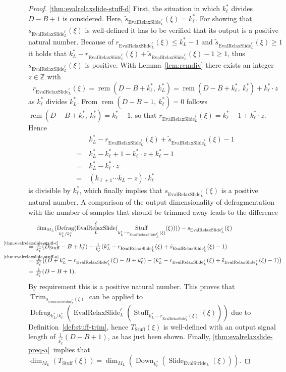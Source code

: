 \documentclass[journal]{IEEEtran}
\newcommand{\Z}{\mathbb{Z}}
\newcommand{\ROI}{B}
\DeclareMathOperator{\Slide}{Slide}
\DeclareMathOperator{\Defragmentation}{Defrag}
\DeclareMathOperator{\EvalStride}{EvalStride}
\DeclareMathOperator{\Stuffing}{Stuff}
\DeclareMathOperator{\Trimming}{Trim}
\newcommand{\rem}[2]{\operatorname{rem}(#1,\ #2)}
\newcommand{\equsing}[1]{\overset{\mathclap{\text{#1}}}{=}}
\DeclareMathOperator{\EvalRelaxSlide}{EvalRelaxSlide}
\DeclareMathOperator{\Downsampling}{Down}
\begin{document}
\begin{proof}
\ref{thm:evalrelaxslide-stuff-d}
First, the situation in which $k_\ell^*$ divides $D - \ROI + 1$ is considered.
Here, $\tilde{s}_{\EvalRelaxSlide_L^\ell}(\xi) = k_\ell^*$.
For showing that $s_{\EvalRelaxSlide_L^\ell}(\xi)$ is well-defined it has to be verified that its output is a positive natural number.
Because of $r_{\EvalRelaxSlide_L^\ell}(\xi) \leq k_L^* - 1$ and $\tilde{s}_{\EvalRelaxSlide_L^\ell}(\xi) \geq 1$ it holds that $k_L^* - r_{\EvalRelaxSlide_L^\ell}(\xi) + \tilde{s}_{\EvalRelaxSlide_L^\ell}(\xi) - 1 \geq 1$, thus $s_{\EvalRelaxSlide_L^\ell}(\xi)$ is positive.
With Lemma~\ref{lem:remdiv} there exists an integer $z\in\Z$ with
\begin{displaymath}
  r_{\EvalRelaxSlide_L^\ell}(\xi) = \rem{D - \ROI + k_\ell^*}{k_L^*} = \rem{D - \ROI + k_\ell^*}{k_\ell^*} + k_\ell^*\cdot z
\end{displaymath}
as $k_\ell^*$ divides $k_L^*$.
From $\rem{D - \ROI + 1}{k_\ell^*} = 0$ follows $\rem{D - \ROI + k_\ell^*}{k_\ell^*} = k_\ell^* - 1$, so that $r_{\EvalRelaxSlide_L^\ell}(\xi) = k_\ell^* - 1 + k_\ell^*\cdot z$.
Hence
\begin{align*}
  & k_L^* - r_{\EvalRelaxSlide_L^\ell}(\xi) + \tilde{s}_{\EvalRelaxSlide_L^\ell}(\xi) - 1\\
  =\ & k_L^* - k_\ell^* + 1 - k_\ell^*\cdot z + k_\ell^* - 1\\
  =\ & k_L^* - k_\ell^*\cdot z\\
  =\ & (k_{\ell + 1}\cdots k_L - z)\cdot k_\ell^*
\end{align*}
is divisible by $k_\ell^*$, which finally implies that $s_{\EvalRelaxSlide_L^\ell}(\xi)$ is a positive natural number.
A comparison of the output dimensionality of defragmentation with the number of samples that should be trimmed away leads to the difference
\begin{align*}
  & \dim_{M_L}( \Defragmentation_{k_L^* / k_\ell^*}( \EvalRelaxSlide_L^\ell( \Stuffing_{k_L^* - r_{\EvalRelaxSlide_L^\ell}(\xi)}(\xi) ) ) ) - s_{\EvalRelaxSlide_L^\ell}(\xi)\\
  \equsing{\ref{thm:evalrelaxslide-stuff-c}}\ & \tfrac{1}{k_\ell^*}(D_{\Stuffing} - \ROI + k_\ell^*) - \tfrac{1}{k_\ell^*} (k_L^* - r_{\EvalRelaxSlide_L^\ell}(\xi) + \tilde{s}_{\EvalRelaxSlide_L^\ell}(\xi) - 1)\\
  \equsing{\ref{thm:evalrelaxslide-stuff-a}}\ & \tfrac{1}{k_\ell^*}\big( (D + k_L^* - r_{\EvalRelaxSlide_L^\ell}(\xi) - \ROI + k_\ell^*) - (k_L^* - r_{\EvalRelaxSlide_L^\ell}(\xi) + \tilde{s}_{\EvalRelaxSlide_L^\ell}(\xi) - 1) \big)\\
  =\ & \tfrac{1}{k_\ell^*}(D - \ROI + 1)\text{.}
\end{align*}
By requirement this is a positive natural number.
This proves that $\Trimming_{s_{\EvalRelaxSlide_L^\ell}(\xi)}$ can be applied to $\Defragmentation_{k_L^* / k_\ell^*}( \EvalRelaxSlide_L^\ell( \Stuffing_{k_L^* - r_{\EvalRelaxSlide_L^\ell}(\xi)}(\xi) ) )$ due to Definition~\ref{def:stuff-trim}, hence $T_{\Stuffing}(\xi)$ is well-defined with an output signal length of $\tfrac{1}{k_\ell^*}(D - \ROI + 1)$, as has just been shown.
Finally, \ref{thm:evalrelaxslide-preq-a}~implies that $\dim_{M_L}( T_{\Stuffing}(\xi) ) = \dim_{M_L}( \Downsampling_{k_\ell^*}( \Slide_{\EvalStride_L}(\xi) ) )$.


\end{proof}
\end{document}
